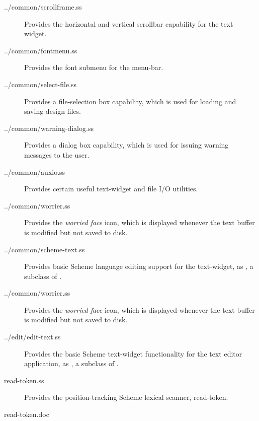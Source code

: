 \documentclass{article}
\begin{document}
\begin{description}


\item[../common/scrollframe.ss]

Provides the horizontal and vertical scrollbar capability for the text
widget.


\item[../common/fontmenu.ss]

Provides the font submenu for the menu-bar.


\item[../common/select-file.ss]

Provides a file-selection box capability, which is used for loading
and saving design files.


\item[../common/warning-dialog.ss]

Provides a dialog box capability, which is used for issuing warning
messages to the user.


\item[../common/auxio.ss]

Provides certain useful text-widget and file I/O utilities.


\item[../common/worrier.ss]

Provides the {\em worried face} icon, which is displayed whenever the text
buffer is modified but not saved to disk.


\item[../common/scheme-text.ss]

Provides basic Scheme language editing support for the text-widget, as
, a subclass of .


\item[../common/worrier.ss]

Provides the {\em worried face} icon, which is displayed whenever the text
buffer is modified but not saved to disk.


\item[../edit/edit-text.ss]

Provides the basic Scheme text-widget functionality for the text
editor application, as , a subclass of
.


\item[read-token.ss]

Provides the position-tracking Scheme lexical scanner, {\sf
read-token}.


\item[read-token.doc]


\end{description}
\end{document}
